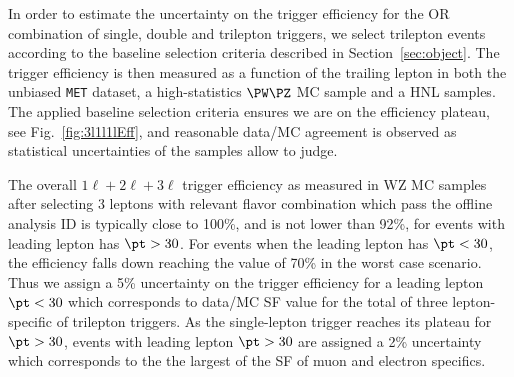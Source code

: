 In order to estimate the uncertainty on the trigger efficiency for the OR combination of single, double and trilepton triggers,
we select trilepton events according to the baseline selection criteria described in Section~\ref{sec:object}.
The trigger efficiency is then measured as a function of the trailing
lepton \pt in both the unbiased \verb!MET! dataset, a high-statistics $\PW\PZ$ MC sample and a HNL samples. 
The applied baseline selection criteria
ensures we are on the efficiency plateau, see Fig.~\ref{fig:3l1l1lEff}, and reasonable data/MC agreement is observed 
as statistical uncertainties of the samples allow to judge.

The overall $1\ell+2\ell+3\ell$ trigger efficiency as measured in WZ MC samples 
after selecting 3 leptons with relevant flavor combination which pass
the offline analysis ID is typically close to 100\%, and is not lower
than 92\%, for events with leading lepton has $\pt > 30$\GeV. For
events when the leading lepton has $\pt < 30$\GeV, the efficiency
falls down reaching the value of 70\% in the worst case scenario.
Thus we assign a 5\% uncertainty
on the trigger efficiency for a leading lepton $\pt < 30$\GeV $\;$which corresponds to data/MC SF value 
for the total of three lepton-specific of trilepton triggers.
As the single-lepton trigger reaches its plateau for $\pt > 30$\GeV,
events with leading lepton $\pt > 30$\GeV$\;$are assigned a 2\%
uncertainty which corresponds to the the largest of the SF of muon and electron specifics. 

